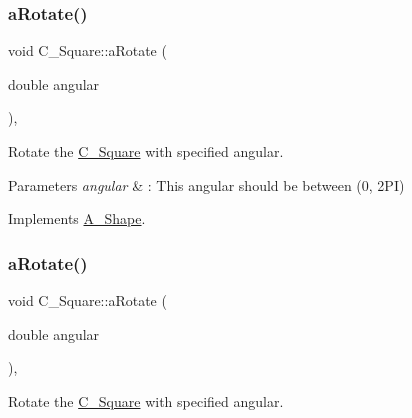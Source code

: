 \mbox{\label{classC__Square_af74175a5e8d61216d68fde18ef9c9481}} 
\subsubsection{\texorpdfstring{a\+Rotate()}{aRotate()}\hspace{0.1cm}{\footnotesize\ttfamily [1/2]}}
{\footnotesize\ttfamily void C\+\_\+\+Square\+::a\+Rotate (\begin{DoxyParamCaption}\item[{double}]{angular }\end{DoxyParamCaption})\hspace{0.3cm}{\ttfamily [override]}, {\ttfamily [virtual]}}



Rotate the \hyperlink{classC__Square}{C\+\_\+\+Square} with specified angular. 


\begin{DoxyParams}{Parameters}
{\em angular} & \+: This angular should be between (0, 2\+PI) \\
\hline
\end{DoxyParams}


Implements \hyperlink{classA__Shape_a25b4e0c34cdb46da5382fe9c7467efaf}{A\+\_\+\+Shape}.

\mbox{\label{classC__Square_af74175a5e8d61216d68fde18ef9c9481}} 
\subsubsection{\texorpdfstring{a\+Rotate()}{aRotate()}\hspace{0.1cm}{\footnotesize\ttfamily [2/2]}}
{\footnotesize\ttfamily void C\+\_\+\+Square\+::a\+Rotate (\begin{DoxyParamCaption}\item[{double}]{angular }\end{DoxyParamCaption})\hspace{0.3cm}{\ttfamily [override]}, {\ttfamily [virtual]}}



Rotate the \hyperlink{classC__Square}{C\+\_\+\+Square} with specified angular. 


